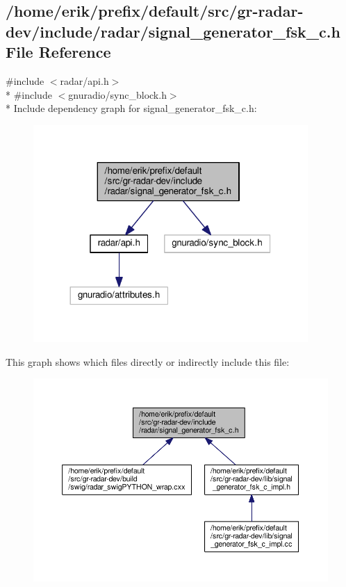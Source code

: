 \subsection{/home/erik/prefix/default/src/gr-\/radar-\/dev/include/radar/signal\+\_\+generator\+\_\+fsk\+\_\+c.h File Reference}
\label{signal__generator__fsk__c_8h}
{\ttfamily \#include $<$radar/api.\+h$>$}\\*
{\ttfamily \#include $<$gnuradio/sync\+\_\+block.\+h$>$}\\*
Include dependency graph for signal\+\_\+generator\+\_\+fsk\+\_\+c.\+h\+:
\nopagebreak
\begin{figure}[H]
\begin{center}
\leavevmode
\includegraphics[width=296pt]{d4/dc5/signal__generator__fsk__c_8h__incl}
\end{center}
\end{figure}
This graph shows which files directly or indirectly include this file\+:
\nopagebreak
\begin{figure}[H]
\begin{center}
\leavevmode
\includegraphics[width=350pt]{df/d4f/signal__generator__fsk__c_8h__dep__incl}
\end{center}
\end{figure}
